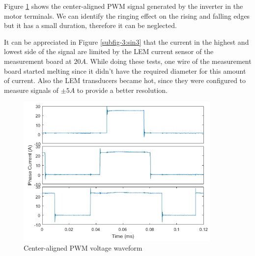 Figure \ref{fig:center_pwm} shows the center-aligned PWM signal generated by the inverter in the motor terminals. We can identify the ringing effect on the rising and falling edges but it has a small duration, therefore it can be neglected.

It can be appreciated in Figure \ref{subfig-3:sin3} that the current in the highest and lowest side of the signal are limited by the LEM current sensor of the measurement board at $20A$. While doing these tests, one wire of the measurement board started melting since it didn't have the required diameter for this amount of current. Also the LEM transducers became hot, since they were configured to measure signals of $\pm5A$ to provide a better resolution.

\begin{figure}[h!p]
\centering
\includegraphics[width=10cm]{Images/waveforms/center_pwm.png} 
\caption[Center-aligned PWM voltage waveform]{Center-aligned PWM voltage waveform}
\label{fig:center_pwm}
\end{figure}

